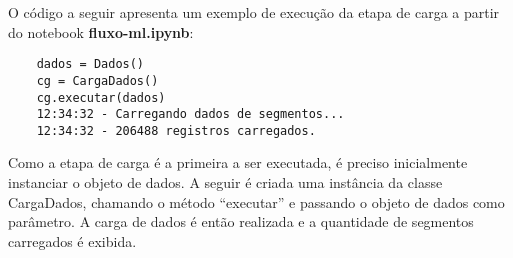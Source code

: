 O código a seguir apresenta um exemplo de execução da etapa de carga a partir do notebook \textbf{fluxo-ml.ipynb}: 

\begin{lstlisting}
	dados = Dados()
	cg = CargaDados()
	cg.executar(dados)
	12:34:32 - Carregando dados de segmentos...
	12:34:32 - 206488 registros carregados.
\end{lstlisting}

Como a etapa de carga é a primeira a ser executada, é preciso inicialmente instanciar o objeto de dados. A seguir é criada uma instância da classe CargaDados, chamando o método ``executar'' e passando o objeto de dados como parâmetro. A carga de dados é então realizada e a quantidade de segmentos carregados é exibida. 



